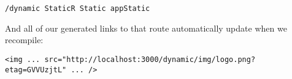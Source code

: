 \begin{Verbatim}[samepage=true]
/dynamic StaticR Static appStatic
\end{Verbatim}

And all of our generated links to that route automatically update when we recompile:

\begin{Verbatim}[samepage=true]
<img ... src="http://localhost:3000/dynamic/img/logo.png?etag=GVVUzjtL" ... />
\end{Verbatim}


